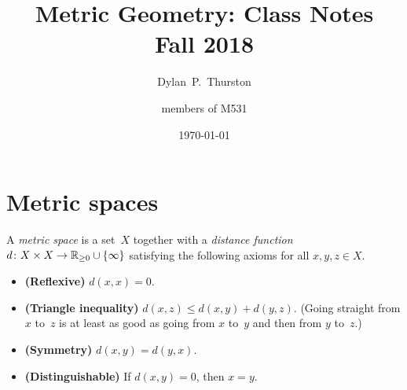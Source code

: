 \documentclass[12pt]{amsart}
\begin{document}
\title[Metric Geometry: Class Notes]{Metric Geometry: Class Notes\\
  \small Fall 2018}

\author[Thurston]{Dylan~P.~Thurston}
\author{members of M531}
\date{\today}

\maketitle

\tableofcontents

\section{Metric spaces}
\label{sec:metric-spaces}

\begin{definition}
  A \emph{metric space} is a set~$X$ together with a \emph{distance
    function} $d \colon X \times X \to \RR_{\ge 0} \cup \{\infty\}$
  satisfying the following axioms for all $x,y,z \in X$.
  \begin{itemize}
  \item \textbf{(Reflexive)} $d(x,x) = 0$.
  \item \textbf{(Triangle inequality)} $d(x,z) \le d(x,y) + d(y,z)$.
    (Going straight from $x$ to~$z$ is at least as good as going from
    $x$ to~$y$ and then from $y$ to~$z$.)
  \item \textbf{(Symmetry)} $d(x,y) = d(y,x)$.
  \item \textbf{(Distinguishable)} If $d(x,y) = 0$, then $x = y$.
  \end{itemize}
\end{definition}
\end{document}
